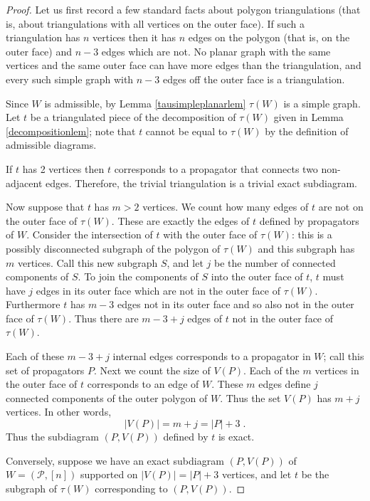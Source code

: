\documentclass[11pt]{article}
\newcommand{\cP}{\mathcal{P}}
\theoremstyle{remark}
\theoremstyle{definition}
\begin{document}
\begin{proof}
Let us first record a few standard facts about polygon triangulations (that is, about triangulations with all vertices on the outer face).  If such a triangulation has $n$ vertices then it has $n$ edges on the polygon (that is, on the outer face) and $n-3$ edges which are not.  No planar graph with the same vertices and the same outer face can have more edges than the triangulation, and every such simple graph with $n-3$ edges off the outer face is a triangulation.

Since $W$ is admissible, by Lemma \ref{tausimpleplanarlem} $\tau(W)$ is a simple graph. Let $t$ be a triangulated piece of the decomposition of $\tau(W)$ given in Lemma \ref{decompositionlem}; note that $t$ cannot be equal to $\tau(W)$ by the definition of admissible diagrams.

If $t$ has 2 vertices then $t$ corresponds to a propagator that connects two non-adjacent edges. Therefore, the trivial triangulation is a trivial exact subdiagram.

Now suppose that $t$ has $m>2$ vertices.  We count how many edges of $t$ are not on the outer face of $\tau(W)$.  These are exactly the edges of $t$ defined by propagators of $W$. Consider the intersection of $t$ with the outer face of $\tau(W)$: this is a possibly disconnected subgraph of the polygon of $\tau(W)$ and this subgraph has $m$ vertices. Call this new subgraph $S$, and let $j$ be the number of connected components of $S$.   To join the components of $S$ into the outer face of $t$, $t$ must have $j$ edges in its outer face which are not in the outer face of $\tau(W)$.  Furthermore $t$ has $m-3$ edges not in its outer face and so also not in the outer face of $\tau(W)$.  Thus there are $m-3+j$ edges of $t$ not in the outer face of $\tau(W)$.

Each of these $m-3+j$ internal edges corresponds to a propagator in $W$; call this set of propagators $P$.  Next we count the size of $V(P)$.  Each of the $m$ vertices in the outer face of $t$ corresponds to an edge of $W$. These $m$ edges define $j$ connected components of the outer polygon of $W$. Thus the set $V(P)$ has $m+j$ vertices.  In other words, 
\[|V(P)| = m+j = |P| +3\;.\]
Thus the subdiagram $(P,V(P))$ defined by $t$ is exact.


Conversely, suppose we have an exact subdiagram $(P, V(P))$ of $W = (\cP, [n])$ supported on $|V(P)| = |P|+3$ vertices, and let $t$ be the subgraph of $\tau(W)$ corresponding to $(P,V(P))$.


\end{proof}
\end{document}
